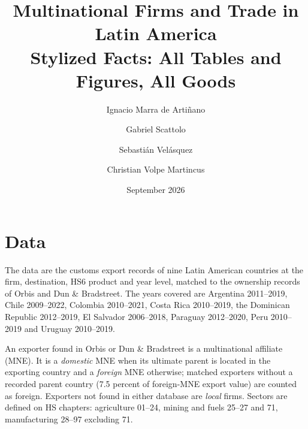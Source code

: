 \documentclass[11pt,a4paper]{article}
\title{Multinational Firms and Trade in Latin America\\[4pt]\large Stylized Facts: All Tables and Figures, All Goods}
\author{Ignacio Marra de Arti\~nano \and Gabriel Scattolo \and Sebasti\'an Vel\'asquez \and Christian Volpe Martincus}
\date{September 2026}
\begin{document}
\maketitle
\tableofcontents
\clearpage

\section*{Data}

The data are the customs export records of nine Latin American countries at the firm, destination,
HS6 product and year level, matched to the ownership records of Orbis and Dun \& Bradstreet. The
years covered are Argentina 2011--2019, Chile 2009--2022, Colombia 2010--2021, Costa Rica
2010--2019, the Dominican Republic 2012--2019, El Salvador 2006--2018, Paraguay 2012--2020, Peru
2010--2019 and Uruguay 2010--2019.

An exporter found in Orbis or Dun \& Bradstreet is a multinational affiliate (MNE). It is a
\emph{domestic} MNE when its ultimate parent is located in the exporting country and a
\emph{foreign} MNE otherwise; matched exporters without a recorded parent country (7.5 percent of
foreign-MNE export value) are counted as foreign. Exporters not found in either database are
\emph{local} firms. Sectors are defined on HS chapters: agriculture 01--24, mining and fuels
25--27 and 71, manufacturing 28--97 excluding 71.
\end{document}
